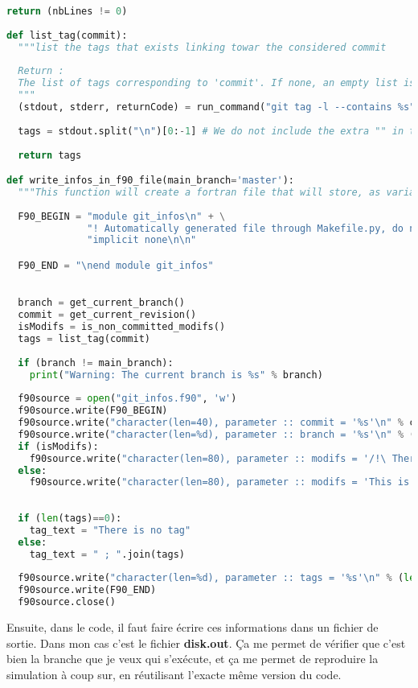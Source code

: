 \begin{lstlisting}[language=python]
  return (nbLines != 0)
  
def list_tag(commit):
  """list the tags that exists linking towar the considered commit
  
  Return :
  The list of tags corresponding to 'commit'. If none, an empty list is returned.
  """
  (stdout, stderr, returnCode) = run_command("git tag -l --contains %s" % commit)
  
  tags = stdout.split("\n")[0:-1] # We do not include the extra "" in the end.
  
  return tags 

def write_infos_in_f90_file(main_branch='master'):
  """This function will create a fortran file that will store, as variable, some infos about a git repository"""
  
  F90_BEGIN = "module git_infos\n" + \
              "! Automatically generated file through Makefile.py, do not modify manually !\n" + \
              "implicit none\n\n"

  F90_END = "\nend module git_infos"

  
  branch = get_current_branch()
  commit = get_current_revision()
  isModifs = is_non_committed_modifs()
  tags = list_tag(commit)
  
  if (branch != main_branch):
    print("Warning: The current branch is %s" % branch)
  
  f90source = open("git_infos.f90", 'w')
  f90source.write(F90_BEGIN)
  f90source.write("character(len=40), parameter :: commit = '%s'\n" % commit)
  f90source.write("character(len=%d), parameter :: branch = '%s'\n" % (len(branch), branch))
  if (isModifs):
    f90source.write("character(len=80), parameter :: modifs = '/!\ There is non committed modifications'\n")
  else:
    f90source.write("character(len=80), parameter :: modifs = 'This is a pure version (without any local modifs)'\n")
    
  
  if (len(tags)==0):
    tag_text = "There is no tag"
  else:
    tag_text = " ; ".join(tags)
  
  f90source.write("character(len=%d), parameter :: tags = '%s'\n" % (len(tag_text), tag_text))
  f90source.write(F90_END)
  f90source.close()
\end{lstlisting}

Ensuite, dans le code, il faut faire écrire ces informations dans un fichier de sortie. Dans mon cas c'est le fichier \textbf{disk.out}. Ça me permet de vérifier que c'est bien la branche que je veux qui s'exécute, et ça me permet de reproduire la simulation à coup sur, en réutilisant l'exacte même version du code. 


